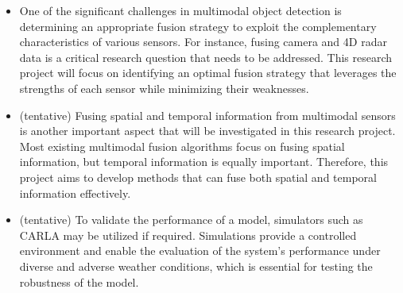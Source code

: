 \documentclass[rnd]{mas_proposal}
\begin{document}
\begin{itemize}
      \item One of the significant challenges in multimodal object detection is determining an appropriate fusion strategy to exploit the complementary characteristics of various sensors. For instance, fusing camera and 4D radar data is a critical research question that needs to be addressed. This research project will focus on identifying an optimal fusion strategy that leverages the strengths of each sensor while minimizing their weaknesses.

      \item (tentative) Fusing spatial and temporal information from multimodal sensors is another important aspect that will be investigated in this research project. Most existing multimodal fusion algorithms focus on fusing spatial information, but temporal information is equally important. Therefore, this project aims to develop methods that can fuse both spatial and temporal information effectively.

      \item (tentative) To validate the performance of a model, simulators such as CARLA may be utilized if required. Simulations provide a controlled environment and enable the evaluation of the system's performance under diverse and adverse weather conditions, which is essential for testing the robustness of the model.


\end{itemize}
\end{document}
